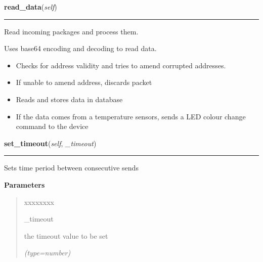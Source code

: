 \hspace{.8\funcindent}\begin{boxedminipage}{\funcwidth}

    \raggedright \textbf{read\_data}(\textit{self})

    \vspace{-1.5ex}

    \rule{\textwidth}{0.5\fboxrule}
\setlength{\parskip}{2ex}
    Read incoming packages and process them.

    Uses base64 encoding and decoding to read data.

    \begin{itemize}
    \setlength{\parskip}{0.6ex}
      \item Checks for address validity and tries to amend corrupted addresses.

      \item If unable to amend address, discards packet

      \item Reads and stores data in database

      \item If the data comes from a temperature sensors, sends a LED colour 
        change command to the device

    \end{itemize}

\setlength{\parskip}{1ex}
    \end{boxedminipage}

    \label{sensor_thread:Sensor:set_timeout}

    \vspace{0.5ex}

\hspace{.8\funcindent}\begin{boxedminipage}{\funcwidth}

    \raggedright \textbf{set\_timeout}(\textit{self}, \textit{\_timeout})

    \vspace{-1.5ex}

    \rule{\textwidth}{0.5\fboxrule}
\setlength{\parskip}{2ex}
    Sets time period between consecutive sends

\setlength{\parskip}{1ex}
      \textbf{Parameters}
      \vspace{-1ex}

      \begin{quote}
        \begin{Ventry}{xxxxxxxx}

          \item[\_timeout]

          the timeout value to be set

            {\it (type=number)}

        \end{Ventry}

      \end{quote}

    \end{boxedminipage}


